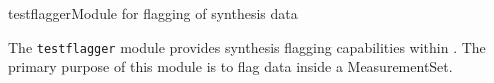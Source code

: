 
\begin{ahmodule}{testflagger}{Module for flagging of synthesis data}

\begin{ahdescription}

The {\tt testflagger} module provides synthesis flagging capabilities
within \aipspp. The primary purpose of this module is to flag data
inside a MeasurementSet.
\end{ahdescription}



\end{ahmodule}
